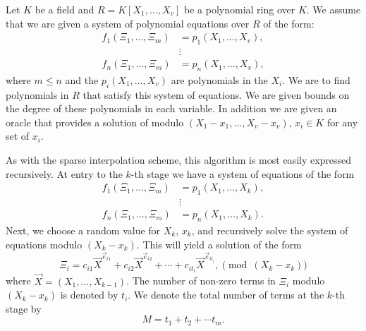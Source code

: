 Let $K$ be a field and $R = K[X_1, \ldots, X_v]$ be a polynomial ring
over $K$.  We assume that we are given a system of polynomial equations
over $R$ of the form:
\begin{equation} \label{SPH:MVar:Eq}
\begin{aligned}
f_1(\Xi_1, \ldots, \Xi_m) & = p_1(X_1, \ldots, X_v), \\
& \vdots \\
f_n(\Xi_1, \ldots, \Xi_m) & = p_n(X_1, \ldots, X_v),
\end{aligned}
\end{equation}
where $m\le n$ and the $p_i(X_1, \ldots, X_v)$ are polynomials in the
$X_i$.  We are to find polynomials in $R$ that satisfy this system of
equations.  We are given bounds on the degree of these polynomials in
each variable.  In addition we are given an oracle that provides a
solution of  modulo $(X_1- x_1, \ldots, X_v -
x_v)$, $x_i \in K$ for any set of $x_i$.

As with the sparse interpolation scheme, this algorithm is most easily
expressed recursively.  At entry to the $k$-th stage we have a
system of equations of the form 
\begin{equation} \label{SPH:MVark:Eq}
\begin{aligned}
f_1(\Xi_1, \ldots, \Xi_m) & = p_1(X_1, \ldots, X_k), \\
& \vdots \\
f_n(\Xi_1, \ldots, \Xi_m) & = p_n(X_1, \ldots, X_k).
\end{aligned}
\end{equation}
Next, we choose a random value for $X_k$, $x_k$, and recursively solve
the system of equations  modulo $(X_k - x_k)$.
This will yield a solution of the form 
\begin{equation} \label{SPH:MVark:Sol:Eq}
\Xi_i = c_{i1} \vec{X}^{\vec{e}_{i1}} + c_{i2} \vec{X}^{\vec{e}_{i2}} + \cdots
+ c_{it_i} \vec{X}^{\vec{e}_{it_i}}, \pmod{(X_k-x_k)}
\end{equation}
where $\vec{X} = (X_1, \ldots, X_{k-1})$.  The number of non-zero
terms in $\Xi_i$ modulo $(X_k-x_k)$ is denoted by $t_i$.  We
denote the total number of terms at the $k$-th stage by
\[
M = t_1 + t_2 + \cdots t_m.
\]

